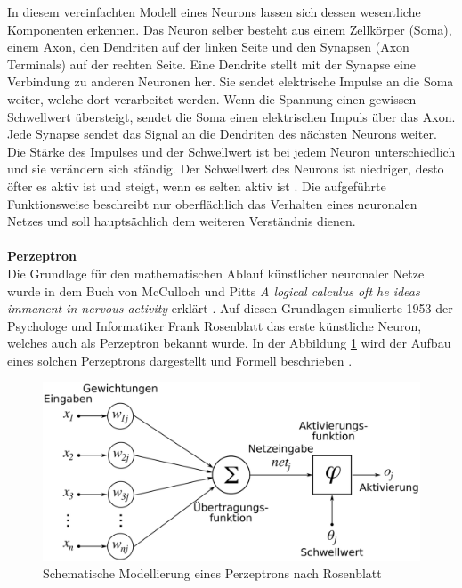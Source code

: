 In diesem vereinfachten Modell eines Neurons lassen sich dessen wesentliche Komponenten erkennen. Das Neuron selber besteht aus einem Zellkörper (Soma), einem Axon, den Dendriten auf der linken Seite und den Synapsen (Axon Terminals) auf der rechten Seite. Eine Dendrite stellt mit der Synapse eine Verbindung zu anderen Neuronen her. Sie sendet elektrische Impulse an die Soma weiter, welche dort verarbeitet werden. Wenn die Spannung einen gewissen Schwellwert übersteigt, sendet die Soma einen elektrischen Impuls über das Axon. Jede Synapse sendet das Signal an die Dendriten des nächsten Neurons weiter. Die Stärke des Impulses und der Schwellwert ist bei jedem Neuron unterschiedlich und sie verändern sich ständig. Der Schwellwert des Neurons ist niedriger, desto öfter es aktiv ist und steigt, wenn es selten aktiv ist \cite{schmidt2013physiologie}. Die aufgeführte Funktionsweise beschreibt nur oberflächlich das Verhalten eines neuronalen Netzes und soll hauptsächlich dem weiteren Verständnis dienen.\\\\
\textbf{Perzeptron}\\
Die Grundlage für den mathematischen Ablauf künstlicher neuronaler Netze wurde in dem Buch von McCulloch und Pitts \textit{A logical calculus oft he ideas immanent in nervous activity} erklärt \cite{McCulloch1943}. Auf diesen Grundlagen simulierte 1953 der Psychologe und Informatiker Frank Rosenblatt das erste künstliche Neuron, welches auch als Perzeptron bekannt wurde. In der Abbildung \ref{img:Perzeptron} wird der Aufbau eines solchen Perzeptrons dargestellt und Formell beschrieben \cite[269]{ertel2013grundkurs}.
\begin{figure}
	[h]
	\centering
	\includegraphics[scale=0.3]{Sources/perzeptron2.png}
	\caption{Schematische Modellierung eines Perzeptrons nach Rosenblatt \cite{perzeptron2019}}
	\label{img:Perzeptron}
\end{figure}\\

